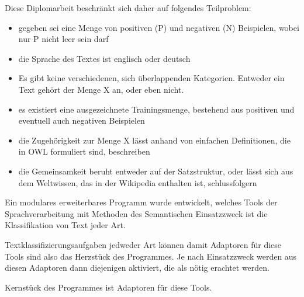 Diese Diplomarbeit beschränkt sich daher auf folgendes Teilproblem:
\begin{itemize}
\item gegeben sei eine Menge von positiven (P) und negativen (N) Beispielen, wobei nur P nicht leer sein darf
\item die Sprache des Textes ist englisch oder deutsch
\item Es gibt keine verschiedenen, sich überlappenden Kategorien. Entweder ein Text gehört der Menge X an, oder eben nicht.
\item es existiert eine ausgezeichnete Trainingsmenge, bestehend aus positiven und eventuell auch negativen Beispielen
\item die Zugehörigkeit zur Menge X lässt anhand von einfachen Definitionen, die in OWL formuliert sind, beschreiben
\item die Gemeinsamkeit beruht entweder auf der Satzstruktur, oder lässt sich aus dem Weltwissen, das in der Wikipedia enthalten ist, schlussfolgern
\end{itemize}



Ein modulares erweiterbares Programm wurde entwickelt, welches Tools der Sprachverarbeitung mit Methoden des Semantischen 
Einsatzzweck ist die Klassifikation von Text jeder Art.

Textklassifizierungsaufgaben jedweder Art können damit 
Adaptoren für diese Tools sind also das Herzstück des Programmes. Je nach Einsatzzweck werden aus diesen Adaptoren dann diejenigen aktiviert, die als nötig erachtet werden.


Kernstück des Programmes ist Adaptoren für diese Tools. 
\fi

